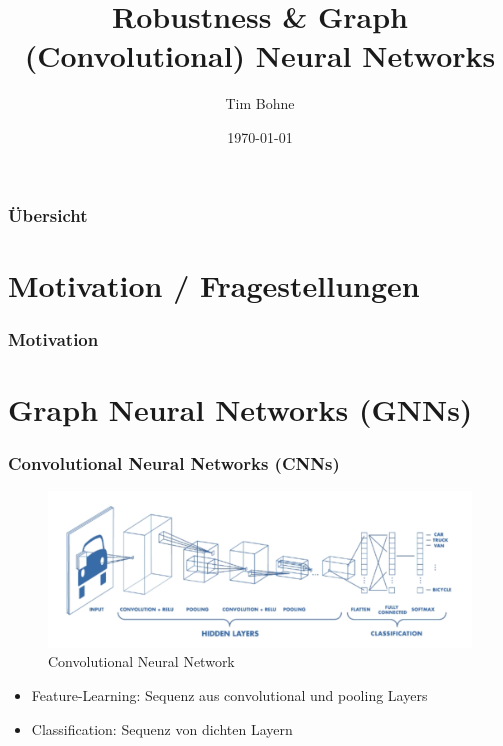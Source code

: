 \documentclass{beamer}
\title[]{Robustness \& Graph (Convolutional) Neural Networks}
\author{Tim Bohne}
\institute[]
{
\textit{Machine Learning Seminar 20/21}
\medskip
}
\date{\today}
\begin{document}
\begin{frame}[plain] %
\titlepage %
\end{frame}

\begin{frame}
\frametitle{Übersicht} %
\tableofcontents
\end{frame}

\section{Motivation / Fragestellungen}

\begin{frame}
  \frametitle{Motivation}
\end{frame}

\section{Graph Neural Networks (GNNs)}

\begin{frame}
  \frametitle{Convolutional Neural Networks (CNNs)}
  \begin{figure}
    \centering
    \includegraphics[width=\textwidth]{img/CNN.png}
    \caption*{Convolutional Neural Network \cite{}}
  \end{figure}
  \begin{itemize}
    \item Feature-Learning: Sequenz aus convolutional und pooling Layers
    \item Classification: Sequenz von dichten Layern
  \end{itemize}
\end{frame}
\end{document}
